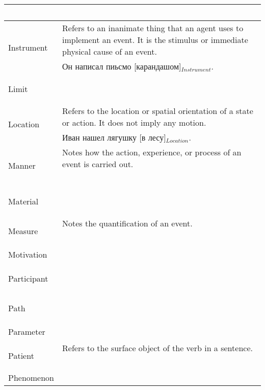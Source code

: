 \documentclass[a4paper,11pt, onecolumn,twoside]{article}
\begin{document}
\begin{longtable}{ p{}  p{} }
        & ~ \\
\midrule
 \multirow{2}{*}{Instrument} & Refers to an inanimate thing that an agent uses to implement an event. It is the stimulus or immediate physical cause of an event. \\ 
        & Он написал пиьсмо [карандашом]$_{Instrument}$. \\
\midrule
 \multirow{2}{*}{Limit} &  ~ \\
        & ~ \\
\midrule
 \multirow{2}{*}{Location} & Refers to the location or spatial orientation of a state or action. It does not imply any motion. \\ 
        & Иван нашел лягушку [в лесу]$_{Location}$. \\
\midrule
 \multirow{2}{*}{Manner} & Notes how the action, experience, or process of an event is carried out. \\ 
        & ~ \\
\midrule
 \multirow{2}{*}{Material} & ~ \\ 
        & ~ \\
\midrule
 \multirow{2}{*}{Measure} & Notes the quantification of an event. \\ 
        & ~ \\
\midrule
 \multirow{2}{*}{Motivation} &  \\ 
        & ~ \\
\midrule
 \multirow{2}{*}{Participant} & ~ \\ 
        & ~ \\
\midrule
 \multirow{2}{*}{Path} & ~ \\ 
        & ~ \\
\midrule
 \multirow{2}{*}{Parameter} & \\
        & ~ \\
\midrule
 \multirow{2}{*}{Patient} & Refers to the surface object of the verb in a sentence. \\ 
        & ~ \\
\midrule
 \multirow{2}{*}{Phenomenon} & ~ \\  %

\end{longtable}
\end{document}

